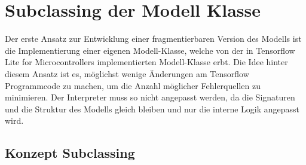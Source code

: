 \section{Subclassing der Modell Klasse}\label{subsec:Subclassing}
    Der erste Ansatz zur Entwicklung einer fragmentierbaren Version des Modells ist die Implementierung einer eigenen Modell-Klasse, welche von der in Tensorflow Lite for Microcontrollers implementierten Modell-Klasse erbt. Die Idee hinter diesem Ansatz ist es, möglichst wenige Änderungen am Tensorflow Programmcode zu machen, um die Anzahl möglicher Fehlerquellen zu minimieren. Der Interpreter muss so nicht angepasst werden, da die Signaturen und die Struktur des Modells gleich bleiben und nur die interne Logik angepasst wird.

\subsection{Konzept Subclassing}
